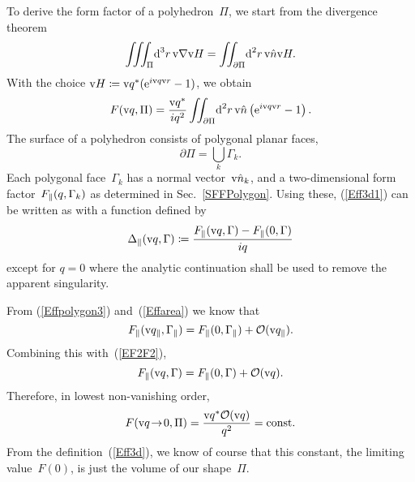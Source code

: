 To derive the form factor of a polyhedron~$\Pi$,
we start from the divergence theorem
\begin{equation}
  \iiint_\Pi\!\text{d}^3r\,\text{v}{\nabla}\text{v}{H} = \iint_{\partial\Pi}\!\text{d}^2r\, \text{v}{\hat n}\text{v}{H}.
\end{equation}
With the choice $\text{v}{H}\coloneqq\text{v}{q}^*(\text{e}^{i\text{v}{q}\text{v}{r}}-1)$,
we obtain
\begin{equation}\label{Eff3d1}
  F(\text{v}{q},\Pi) = \frac{\text{v}{q}^*}{iq^2} \iint_{\partial\Pi}\!\text{d}^2r\, \text{v}{\hat n} \left(\text{e}^{i\text{v}{q}\text{v}{r}}-1\right).
\end{equation}
The surface of a polyhedron consists of polygonal planar faces,
\begin{equation}
  \partial\Pi = \bigcup_k \Gamma_k.
\end{equation}
Each polygonal face~$\Gamma_k$ has a normal vector~$\text{v}{\hat n}_k$,
and a two-dimensional form factor~$F_\parallel(q,\Gamma_k)$ as determined in Sec.~\ref{SFFPolygon}.
Using these, (\ref{Eff3d1}) can be written as
with a function defined by
\begin{equation}
  \Delta_\parallel(\text{v}{q},\Gamma)
  \coloneqq \frac{F_\parallel(\text{v}{q},\Gamma)-F_\parallel(0,\Gamma)}{iq}
\end{equation}
except for $q=0$ where the analytic continuation shall be
used to remove the apparent singularity.

From (\ref{Effpolygon3}) and~(\ref{Effarea})
we know that
\begin{equation}
  F_\parallel(\text{v}{q}_\parallel,\Gamma_\parallel)=F_\parallel(0,\Gamma_\parallel)+\mathcal{O}(\text{v}{q}_\parallel).
\end{equation}
Combining this with~(\ref{EF2F2}),
\begin{equation}
  F_\parallel(\text{v}{q},\Gamma)=F_\parallel(0,\Gamma)+\mathcal{O}(\text{v}{q}).
\end{equation}
Therefore, in lowest non-vanishing order,
\begin{equation}
  F(\text{v}{q}\!\to\!0,\Pi)=\frac{\text{v}{q}^*\mathcal{O}(\text{v}{q})}{q^2}=\text{const}.
\end{equation}
From the definition~(\ref{Eff3d}),
we know of course that this constant, the limiting value~$F(0)$,
is just the volume of
our shape~$\Pi$.



